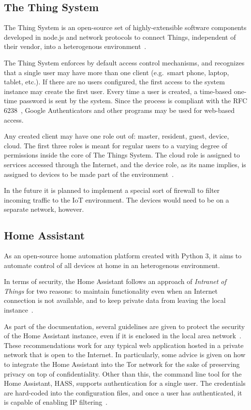 \documentclass[12pt]{article}
\begin{document}
\subsection{The Thing System}

The Thing System is an open-source set of highly-extensible software components developed in node.js and network protocols to connect Things, independent of their vendor, into a heterogenous environment~\cite{related_08}.

The Thing System enforces by default access control mechanisms, and recognizes that a single user may have more than one client (e.g.\ smart phone, laptop, tablet, etc.). If there are no users configured, the first access to the system instance may create the first user. Every time a user is created, a time-based one-time password is sent by the system. Since the process is compliant with the RFC 6238~\cite{RFC6238}, Google Authenticators and other programs may be used for web-based access.

Any created client may have one role out of: master, resident, guest, device, cloud. The first three roles is meant for regular users to a varying degree of permissions inside the core of The Things System. The cloud role is assigned to services accessed through the Internet, and the device role, as its name implies, is assigned to devices to be made part of the environment~\cite{related_08}. 

In the future it is planned to implement a special sort of firewall to filter incoming traffic to the IoT environment. The devices would need to be on a separate network, however.

\subsection{Home Assistant}

As an open-source home automation platform created with Python 3, it aims to automate control of all devices at home in an heterogenous environment.

In terms of security, the Home Assistant follows an approach of \emph{Intranet of Things} for two reasons: to maintain functionality even when an Internet connection is not available, and to keep private data from leaving the local instance~\cite{related_11}.

As part of the documentation, several guidelines are given to protect the security of the Home Assistant instance, even if it is enclosed in the local area network~\cite{related_12}. These recommendations work for any typical web application hosted in a private network that is open to the Internet. In particularly, some advice is given on how to integrate the Home Assistant into the Tor network for the sake of preserving privacy on top of confidentiality. Other than this, the command line tool for the Home Assistant, HASS, supports authentication for a single user. The credentials are hard-coded into the configuration files, and once a user has authenticated, it is capable of enabling IP filtering~\cite{related_10}.
\end{document}
